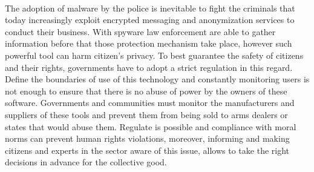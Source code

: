 \paragraph{}
The adoption of malware by the police is inevitable to fight the criminals that today increasingly exploit encrypted messaging and anonymization services to conduct their business. With spyware law enforcement are able to gather information before that those protection mechanism take place, however such powerful tool can harm citizen's privacy. To best guarantee the safety of citizens and their rights, governments have to adopt a strict regulation in this regard. Define the boundaries of use of this technology and constantly monitoring users is not enough to ensure that there is no abuse of power by the owners of these software. Governments and communities must monitor the manufacturers and suppliers of these tools and prevent them from being sold to arms dealers or states that would abuse them. Regulate is possible and compliance with moral norms can prevent human rights violations, moreover, informing and making citizens and experts in the sector aware of this issue, allows to take the right decisions in advance for the collective good.




